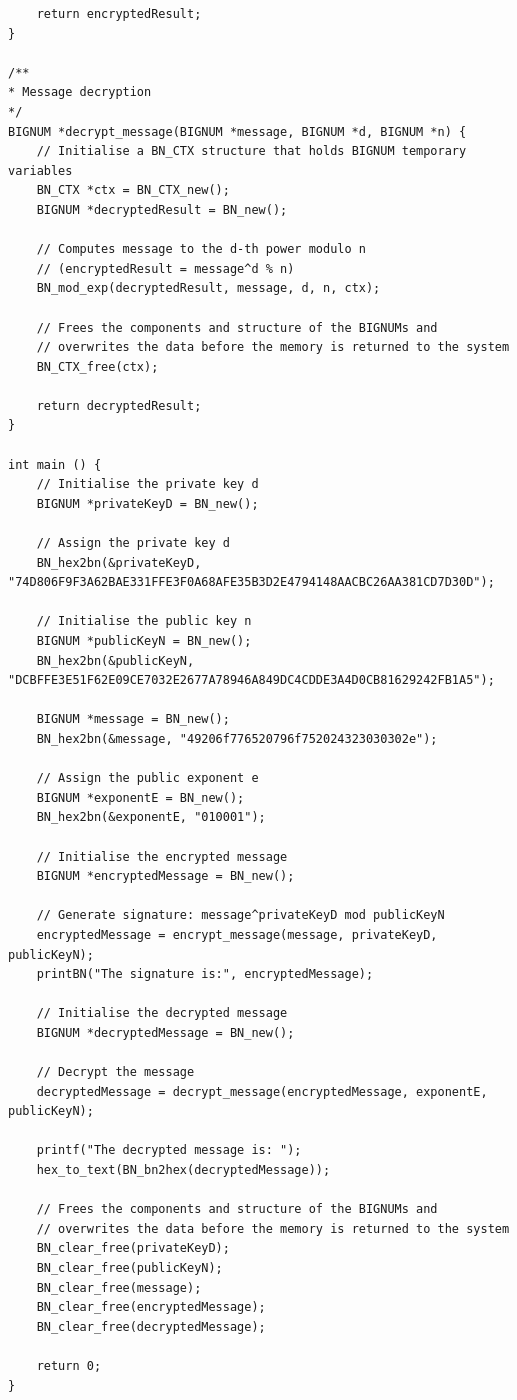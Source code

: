 \documentclass[12pt]{article}
\begin{document}
\begin{lstlisting}
    return encryptedResult;
}

/**
* Message decryption
*/
BIGNUM *decrypt_message(BIGNUM *message, BIGNUM *d, BIGNUM *n) {
    // Initialise a BN_CTX structure that holds BIGNUM temporary variables
    BN_CTX *ctx = BN_CTX_new();
    BIGNUM *decryptedResult = BN_new();

    // Computes message to the d-th power modulo n
    // (encryptedResult = message^d % n)
    BN_mod_exp(decryptedResult, message, d, n, ctx);

    // Frees the components and structure of the BIGNUMs and
    // overwrites the data before the memory is returned to the system
    BN_CTX_free(ctx);

    return decryptedResult;
}

int main () {
    // Initialise the private key d
    BIGNUM *privateKeyD = BN_new();

    // Assign the private key d
    BN_hex2bn(&privateKeyD, "74D806F9F3A62BAE331FFE3F0A68AFE35B3D2E4794148AACBC26AA381CD7D30D");

    // Initialise the public key n
    BIGNUM *publicKeyN = BN_new();
    BN_hex2bn(&publicKeyN, "DCBFFE3E51F62E09CE7032E2677A78946A849DC4CDDE3A4D0CB81629242FB1A5");

    BIGNUM *message = BN_new();
    BN_hex2bn(&message, "49206f776520796f752024323030302e");

    // Assign the public exponent e
    BIGNUM *exponentE = BN_new();
    BN_hex2bn(&exponentE, "010001");

    // Initialise the encrypted message
    BIGNUM *encryptedMessage = BN_new();

    // Generate signature: message^privateKeyD mod publicKeyN
    encryptedMessage = encrypt_message(message, privateKeyD, publicKeyN);
    printBN("The signature is:", encryptedMessage);

    // Initialise the decrypted message
    BIGNUM *decryptedMessage = BN_new();

    // Decrypt the message
    decryptedMessage = decrypt_message(encryptedMessage, exponentE, publicKeyN);

    printf("The decrypted message is: ");
    hex_to_text(BN_bn2hex(decryptedMessage));

    // Frees the components and structure of the BIGNUMs and
    // overwrites the data before the memory is returned to the system            
    BN_clear_free(privateKeyD); 
    BN_clear_free(publicKeyN);
    BN_clear_free(message);
    BN_clear_free(encryptedMessage);
    BN_clear_free(decryptedMessage);

    return 0;    
}    
\end{lstlisting}
\end{document}
